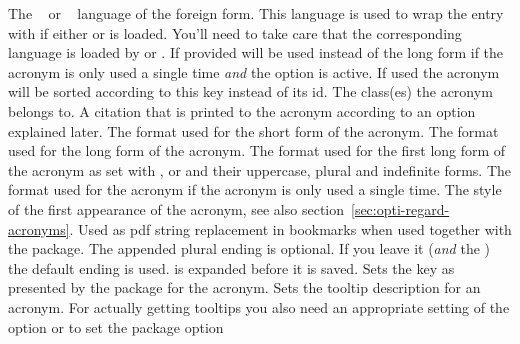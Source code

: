 \documentclass[load-preamble+]{cnltx-doc}
\begin{document}
\begin{options}
    The ~\cite{pkg:babel} or
    ~\cite{pkg:polyglossia} language of the foreign form.
    This language is used to wrap the entry with
     if either  or
     is loaded.  You'll need to take care that the
    corresponding language is loaded by  or .
    If provided  will be used instead of the long
    form if the acronym is only used a single time \emph{and} the option
     is active.
    If used the acronym will be sorted according to this key instead of its
    \acs{id}.
    The class(es) the acronym belongs to.
    A citation that is printed to the acronym according to an option explained
    later.
    The format used for the short form of the acronym.
    The format used for the long form of the acronym.
    The format used for the first long form of the acronym as set with ,
     or  and their uppercase, plural and indefinite forms.
    The format used for the acronym if the acronym is only
    used a single time.
    The style of the first appearance of the acronym, see
    also section~\ref{sec:opti-regard-acronyms}.
    Used as \acs{pdf} string replacement in bookmarks
    when used together with the  package.  The appended plural
    ending is optional.  If you leave it (\emph{and} the \code{/}) the default
    ending is used.   is expanded before it is saved.
    Sets the  key as presented by the  package
    for the acronym.
    Sets the tooltip description for an acronym.  For
    actually getting tooltips you also need an appropriate setting of the
     option or to set the package option

\end{options}
\end{document}
